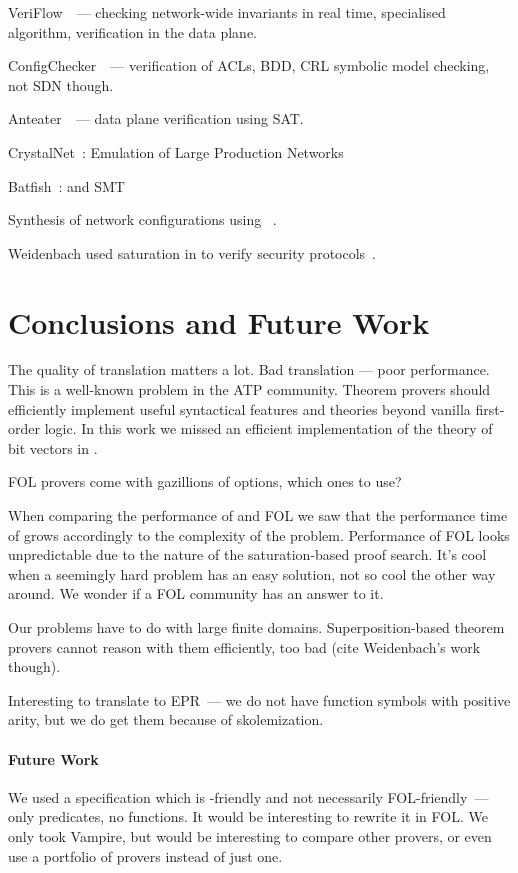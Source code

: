 VeriFlow~\cite{Veriflow}~--- checking network-wide invariants in real time, specialised algorithm, verification in the data plane.

ConfigChecker~\cite{ConfigChecker}~--- verification of ACLs, BDD, CRL symbolic model checking, not SDN though.

Anteater~\cite{Anteater}~--- data plane verification using SAT.

CrystalNet~\cite{crystalnet}: Emulation of Large Production Networks

Batfish~\cite{batfish}: \Datalog and SMT

Synthesis of network configurations using \Datalog~\cite{DBLP:conf/cav/El-HassanyTVV17}.

Weidenbach used saturation in \spass to verify security protocols~\cite{Weidenbach99}.

\section{Conclusions and Future Work}
\label{sect:aws/conclusion}
The quality of translation matters a lot. Bad translation --- poor performance. This is a well-known problem in the ATP community. Theorem provers should efficiently implement useful syntactical features and theories beyond vanilla first-order logic. In this work we missed an efficient implementation of the theory of bit vectors in \vampire.

FOL provers come with gazillions of options, which ones to use?

When comparing the performance of \Datalog and FOL we saw that the performance time of \Datalog grows accordingly to the complexity of the problem. Performance of FOL looks unpredictable due to the nature of the saturation-based proof search. It's cool when a seemingly hard problem has an easy solution, not so cool the other way around. We wonder if a FOL community has an answer to it.

Our problems have to do with large finite domains. Superposition-based theorem provers cannot reason with them efficiently, too bad (cite Weidenbach's work~\cite{HillenbrandWeidenbach13} though).

Interesting to translate to EPR~--- we do not have function symbols with positive arity, but we do get them because of skolemization.

\paragraph{Future Work} We used a specification which is \Datalog-friendly and not necessarily FOL-friendly~--- only predicates, no functions. It would be interesting to rewrite it in FOL. We only took Vampire, but would be interesting to compare other provers, or even use a portfolio of provers instead of just one.

